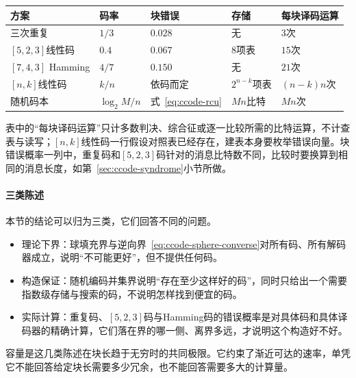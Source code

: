 \begin{BookInlineTable}
 \centering
 \caption{有限块编码的码率、错误与计算代价（二元对称信道，$p=0.1$）}
 \label{tab:ccode-cost}
 \begin{tabular}{lllll}
 \toprule
 方案 & 码率 & 块错误 & 存储 & 每块译码运算 \\
 \midrule
 三次重复 & $1/3$ & $0.028$ & 无 & $3$次 \\
 $[5,2,3]$线性码 & $0.4$ & $0.067$ & $8$项表 & $15$次 \\
 $[7,4,3]$ Hamming & $4/7$ & $0.150$ & 无 & $21$次 \\
 $[n,k]$线性码 & $k/n$ & 依码而定 & $2^{n-k}$项表 & $(n-k)n$次 \\
 随机码本 & $\log_2M/n$ & 式~\eqref{eq:ccode-rcu} & $Mn$比特 & $Mn$次 \\
 \bottomrule
 \end{tabular}
\end{BookInlineTable}

表中的“每块译码运算”只计多数判决、综合征或逐一比较所需的比特运算，不计查表与读写；$[n,k]$线性码一行假设对照表已经存在，建表本身要枚举错误向量。块错误概率一列中，重复码和$[5,2,3]$码针对的消息比特数不同，比较时要换算到相同的消息长度，如第~\ref{sec:ccode-syndrome}小节所做。

\paragraph{三类陈述}
本节的结论可以归为三类，它们回答不同的问题。
\begin{itemize}
 \item 理论下界：球填充界与逆向界~\eqref{eq:ccode-sphere-converse}对所有码、所有解码器成立，说明“不可能更好”，但不提供任何码。
 \item 构造保证：随机编码并集界说明“存在至少这样好的码”，同时只给出一个需要指数级存储与搜索的码，不说明怎样找到便宜的码。
 \item 实际计算：重复码、$[5,2,3]$码与Hamming码的错误概率是对具体码和具体译码器的精确计算，它们落在界的哪一侧、离界多远，才说明这个构造好不好。
\end{itemize}
容量是这几类陈述在块长趋于无穷时的共同极限。它约束了渐近可达的速率，单凭它不能回答给定块长需要多少冗余，也不能回答需要多大的计算量。
